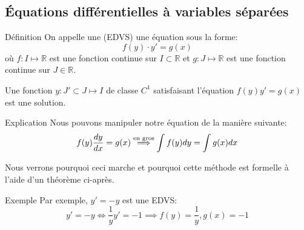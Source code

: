 \documentclass[a4paper]{article}
\begin{document}
\subsection[EDVS]{Équations différentielles à variables séparées}
\begin{parag}{Définition}
    On appelle une  (EDVS) une équation sous la forme: 
    \[f\left(y\right) \cdot y' = g\left(x\right)\]
    où $f: I \mapsto \mathbb{R}$ est une fonction continue sur $I \subset \mathbb{R}$ et $g : J \mapsto \mathbb{R}$ est une fonction continue sur $J \in\mathbb{R}$.

    Une fonction $y: J' \subset J \mapsto I$ de classe $C^1$ satisfaisant l'équation $f\left(y\right) y' = g\left(x\right)$ est une solution.

    \begin{subparag}{Explication}
        Nous pouvons manipuler notre équation de la manière suivante: 
        \[f\left(y\right) \frac{dy}{dx} = g\left(x\right) \over{\implies}{en gros}  \int f\left(y\right) dy = \int g\left(x\right) dx\]

        Nous verrons pourquoi ceci marche et pourquoi cette méthode est formelle à l'aide d'un théorème ci-après.
    \end{subparag}
\end{parag}

\begin{parag}{Exemple}
    Par exemple, $y' = -y$ est une EDVS: 
    \[y' = -y \iff \frac{1}{y} y' = -1 \implies f\left(y\right) = \frac{1}{y}, g\left(x\right) = -1\]
    
\end{parag}
\end{document}
